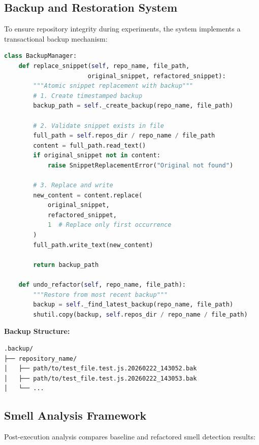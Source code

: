 \subsection{Backup and Restoration System}

To ensure repository integrity during experiments, the system implements a transactional backup mechanism:

\begin{lstlisting}[language=Python, caption=Backup Manager]
class BackupManager:
    def replace_snippet(self, repo_name, file_path, 
                       original_snippet, refactored_snippet):
        """Atomic snippet replacement with backup"""
        # 1. Create timestamped backup
        backup_path = self._create_backup(repo_name, file_path)
        
        # 2. Validate snippet exists in file
        full_path = self.repos_dir / repo_name / file_path
        content = full_path.read_text()
        if original_snippet not in content:
            raise SnippetReplacementError("Original not found")
        
        # 3. Replace and write
        new_content = content.replace(
            original_snippet, 
            refactored_snippet, 
            1  # Replace only first occurrence
        )
        full_path.write_text(new_content)
        
        return backup_path
    
    def undo_refactor(self, repo_name, file_path):
        """Restore from most recent backup"""
        backup = self._find_latest_backup(repo_name, file_path)
        shutil.copy(backup, self.repos_dir / repo_name / file_path)
\end{lstlisting}

\textbf{Backup Structure:}
\begin{verbatim}
.backup/
├── repository_name/
│   ├── path/to/test_file.test.js.20260222_143052.bak
│   ├── path/to/test_file.test.js.20260222_143053.bak
│   └── ...
\end{verbatim}

\subsection{Smell Analysis Framework}

Post-execution analysis compares baseline and refactored smell detection results:

